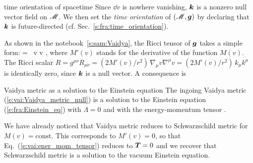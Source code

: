 \begin{tprop}{time orientation of spacetime}{}
Since $\dd v$ is nowhere vanishing, $\bm{k}$ is a nonzero null vector field on $\mathscr{M}$.
We then set the \emph{time orientation} of $(\mathscr{M},\bm{g})$
by declaring that $\bm{k}$ is future-directed (cf. Sec.~\ref{s:fra:time_orientation}).
\end{tprop}

As shown in the notebook~\ref{s:sam:Vaidya},
the Ricci tensor of $\bm{g}$ takes a simple form:
\be \label{e:vai:Ricci_tensor}
     = \, \dd v \otimes \dd v ,
\ee
where $M'(v)$ stands for the derivative of the function $M(v)$.
The Ricci scalar $R = g^{\mu\nu} R_{\mu\nu} = (2M'(v)/r^2) \, \nabla_\mu v \nabla^\mu v =  (2M'(v)/r^2) \, k_\mu k^\mu$ is identically zero, since $\bm{k}$ is a null vector.
A consequence is
\begin{tprop}{Vaidya metric as a solution to the Einstein equation}{}
The ingoing Vaidya metric (\ref{e:vai:Vaidya_metric_null}) is a solution
to the Einstein equation (\ref{e:fra:Einstein_eq})
with $\Lambda = 0$ and with the energy-momentum tensor
\be \label{e:vai:ener_mom_tensor}
    .
\ee
\end{tprop}

\begin{remark}
We have already noticed that Vaidya metric reduces to Schwarzschild metric for $M(v) = \mathrm{const}$.
This corresponds to $M'(v) = 0$, so that
Eq.~(\ref{e:vai:ener_mom_tensor}) reduces to $\bm{T} = 0$ and we recover that
Schwarzschild metric is a solution to the vacuum Einstein equation.
\end{remark}

